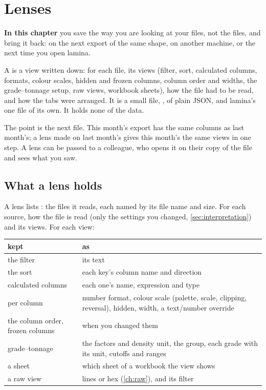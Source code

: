 \chapter{Lenses}\label{ch:lens}
\begin{goals}
\textbf{In this chapter} you save the way you are looking at your files, not the files, and bring it back:
on the next export of the same shape, on another machine, or the next time you open lamina.
\end{goals}

A  is a view written down: for each file, its views (filter, sort, calculated columns, formats,
colour scales, hidden and frozen columns, column order and widths, the grade–tonnage setup, raw views,
workbook sheets), how the file had to be read, and how the tabs were arranged. It is a small file,
, of plain JSON, and lamina's one file of its own. It holds none of the data.

The point is the next file. This month's export has the same columns as last month's; a lens made on last
month's gives this month's the same views in one step. A lens can be passed to a colleague, who opens it
on their copy of the file and sees what you saw.

\section{What a lens holds}\label{sec:lens-holds}

A lens lists : the files it reads, each named by its file name and size. For each source,
how the file is read (only the settings you changed, \cref{sec:interpretation}) and its views. For each
view:

\begin{center}\small
\begin{tabularx}{\linewidth}{@{}lL@{}}
\toprule
\sffamily\bfseries kept & \sffamily\bfseries as \\
\midrule
the filter & its text \\
the sort & each key's column name and direction \\
calculated columns & each one's name, expression and type \\
per column & number format, colour scale (palette, scale, clipping, reversal), hidden, width, a
text/number override \\
the column order, frozen columns & when you changed them \\
grade–tonnage & the factors and density unit, the group, each grade with its unit, cutoffs and ranges \\
a sheet & which sheet of a workbook the view shows \\
a raw view & lines or hex (\cref{ch:raw}), and its filter \\
\bottomrule
\end{tabularx}
\end{center}

